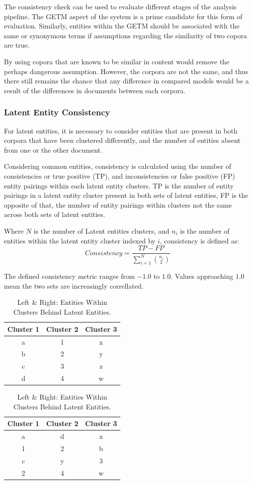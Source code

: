 \documentclass[10pt]{report}
\begin{document}
The consistency check can be used to evaluate different stages of the analysis pipeline. The GETM aspect of the system is a prime candidate for this form of evaluation. Similarly, entities within the GETM should be associated with the same or synonymous terms if assumptions regarding the similarity of two copora are true.

By using copora that are known to be similar in content would remove the perhaps dangerous assumption. However, the corpora are not the same, and thus there still remains the chance that any difference in compared models would be a result of the differences in documents between each corpora.

\subsubsection{Latent Entity Consistency}
For latent entities, it is necessary to consider entities that are present in both corpora that have been clustered differently, and the number of entities absent from one or the other document.

Considering common entities, consistency is calculated using the number of consistencies or true positive (TP), and inconsistencies or false positive (FP) entity pairings within each latent entity clusters. TP is the number of entity pairings in a latent entity cluster present in both sets of latent entities, FP is the opposite of that, the number of entity pairings within clusters not the same across both sets of latent entities.

Where $N$ is the number of Latent entities clusters, and $n_i$ is the number of entities within the latent entity cluster indexed by $i$, consistency is defined as:
\[
  Consistency = \frac{TP - FP}{\sum^{N}_{i=1}{n_i\choose2}}
\]

The defined consistency metric ranges from $-1.0$ to $1.0$. Values approaching $1.0$ mean the two sets are increasingly correllated.

\begin{table}[h!]
  \centering
  \begin{tabular}{c | c | c}
    Cluster 1 & Cluster 2 & Cluster 3 \\
    \hline
    a & 1 & x \\
    b & 2 & y \\
    c & 3 & z \\
    d & 4 & w \\
  \end{tabular}
  \quad
  \begin{tabular}{c | c | c}
    Cluster 1 & Cluster 2 & Cluster 3 \\
    \hline
    a & d & x \\
    1 & 2 & b \\
    c & y & 3 \\
    2 & 4 & w \\
  \end{tabular}
  \caption{Left \& Right: Entities Within Clusters Behind Latent Entities.\label{tab:latent_entity_clusters}}
\end{table}
\end{document}
